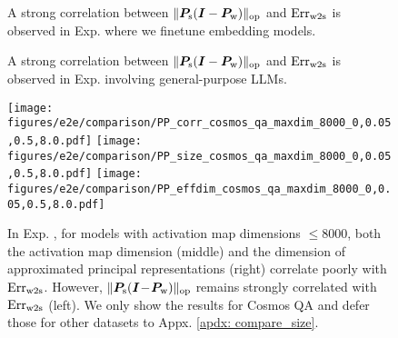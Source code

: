 \begin{figure}[!t]
    \centering
{}
    \caption{{A strong correlation between $\lVert  {\bm{P}}_{\text{s}}({\bm{I}}-{\bm{P}}_{\text{w}})  \rVert_{\mathrm{op}}$ and $\text{Err}_{\text{w2s}}$ is observed in Exp.  where we finetune embedding models. }}
    \label{fig: embedding}
    \vspace{-.3cm}
\end{figure}

\begin{figure}[!t]
    \centering
{}
    \caption{{A strong correlation between $\lVert  {\bm{P}}_{\text{s}}({\bm{I}}-{\bm{P}}_{\text{w}})  \rVert_{\mathrm{op}}$ and $\text{Err}_{\text{w2s}}$ is observed in Exp.  involving general-purpose LLMs.}}
    \label{fig: end2end}
\end{figure}

\begin{figure}[!t]
    \centering
\texttt{[image: figures/e2e/comparison/PP\_corr\_cosmos\_qa\_maxdim\_8000\_0,0.05,0.5,8.0.pdf]}
\texttt{[image: figures/e2e/comparison/PP\_size\_cosmos\_qa\_maxdim\_8000\_0,0.05,0.5,8.0.pdf]}
\texttt{[image: figures/e2e/comparison/PP\_effdim\_cosmos\_qa\_maxdim\_8000\_0,0.05,0.5,8.0.pdf]}
    \caption{{In Exp. , for models with activation map dimensions $\!\leq\! 8000$, both the activation map dimension (middle) and the dimension of approximated principal representations (right) correlate poorly with $\text{Err}_{\text{w2s}}$. However, $\lVert  {\bm{P}}_{\text{s}}({\bm{I}}\!-\!{\bm{P}}_{\text{w}})  \rVert_{\mathrm{op}}$ remains strongly correlated with $\text{Err}_{\text{w2s}}$ (left). We only show the results for Cosmos QA and defer those for other datasets to Appx. \ref{apdx: compare_size}.  }  }
    \label{fig: compare_PP_with_size}
\end{figure}



